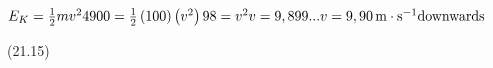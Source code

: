 {\begin{mdframed}[linewidth=4, leftmargin=40, rightmargin=40]
\begin{exercise}
\begin{enumerate}[noitemsep, label=\textbf{Step} \textbf{\arabic*}. ]
{\begin{minipage}{\columnwidth}
    \parbox[t]{\mymathboxwidth}{\large\begin{math}
    {E}_{K}=\frac{1}{2}m{v}^{2}4900=\frac{1}{2}\left(100\right)\left({v}^{2}\right)98={v}^{2}v=9,899...v=9,90\phantom{\rule{0.166667em}{0ex}}\mathrm{m}\ensuremath{\cdot}{\mathrm{s}}^{-1}\mathrm{downwards}\end{math}}\hfill
    \parbox[t]{48pt}{\raggedleft 
    (21.15)}
    \end{minipage}\vspace{12pt}\par
    }%
    
        
        
        \end{enumerate}
         

    \end{exercise}
    \end{mdframed}
    }
    \noindent
  
\par
            \label{m38786*secfhsst!!!underscore!!!id2130}\vspace{.5cm} 
      
